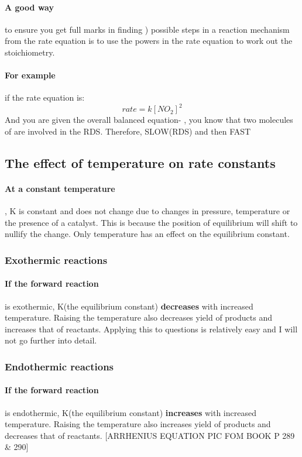 \paragraph{A good way}to ensure you get full marks in finding ) possible steps in a reaction mechanism
from the rate equation is to use the powers in the rate equation to work out the stoichiometry.
\paragraph{For example}if the rate equation is:
 \begin{equation}
 rate=k[NO_2]^2
 \end{equation}
 And you are given the overall balanced equation- , you know that two molecules of  are involved in the RDS. Therefore,
  SLOW(RDS) and then
 FAST
\subsection{The effect of temperature on rate constants}
\paragraph{At a constant temperature}, K is constant and does not change due to changes in pressure, temperature or the presence of a catalyst. This is because the position of equilibrium will shift to nullify the change. Only temperature has an effect on the equilibrium constant.
\subsubsection{Exothermic reactions}
\paragraph{If the forward reaction}is exothermic, K(the equilibrium constant) \textbf{decreases} with increased temperature. Raising the temperature also decreases yield of products and increases that of reactants. Applying this to questions is relatively easy and I will not go further into detail.
\subsubsection{Endothermic reactions}
\paragraph{If the forward reaction}is endothermic, K(the equilibrium constant) \textbf{increases} with increased temperature. Raising the temperature also increases yield of products and decreases that of reactants.
[ARRHENIUS EQUATION PIC FOM BOOK P 289 & 290]
